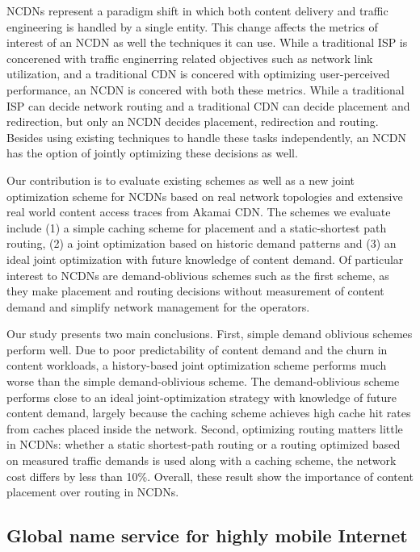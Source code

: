 NCDNs represent a paradigm shift in which both content delivery and traffic engineering is handled by a single entity. This change affects the metrics of interest of an NCDN as well the techniques it can use. While a traditional ISP is concerened with traffic enginerring related objectives such as network link utilization, and a traditional CDN is concered with optimizing user-perceived performance, an NCDN is concered with both these metrics. While a traditional ISP can decide network routing and a traditional CDN can decide placement and redirection, but only an NCDN decides placement, redirection and routing. Besides using existing techniques to handle these tasks independently, an NCDN has the option of jointly optimizing these decisions as well. 

Our contribution is to evaluate existing schemes as well as a new joint optimization scheme for NCDNs based on real network topologies and extensive real world content access traces from Akamai CDN. The schemes we evaluate include (1) a simple caching scheme for placement and a static-shortest path routing, (2) a joint optimization based on historic demand patterns and (3) an ideal joint optimization with future knowledge of content demand. Of particular interest to NCDNs are demand-oblivious schemes such as the first scheme, as they make placement and routing decisions without measurement of content demand and simplify network management for the operators.

Our study presents two main conclusions. First, simple demand oblivious schemes perform well. Due to poor predictability of content demand and the churn in content workloads, a history-based joint optimization scheme performs much worse than the simple demand-oblivious scheme. The demand-oblivious scheme performs close to an ideal joint-optimization strategy with knowledge of future content demand, largely because the caching scheme achieves high cache hit rates from caches placed inside the network. Second, optimizing routing matters little in NCDNs: whether a static shortest-path routing or a routing optimized based on measured traffic demands is used along with a caching scheme, the network cost differs by less than 10\%.  Overall, these result show the importance of content placement over routing in NCDNs.

\subsection{Global name service for highly mobile Internet}
\label{sec:intro-gns}

